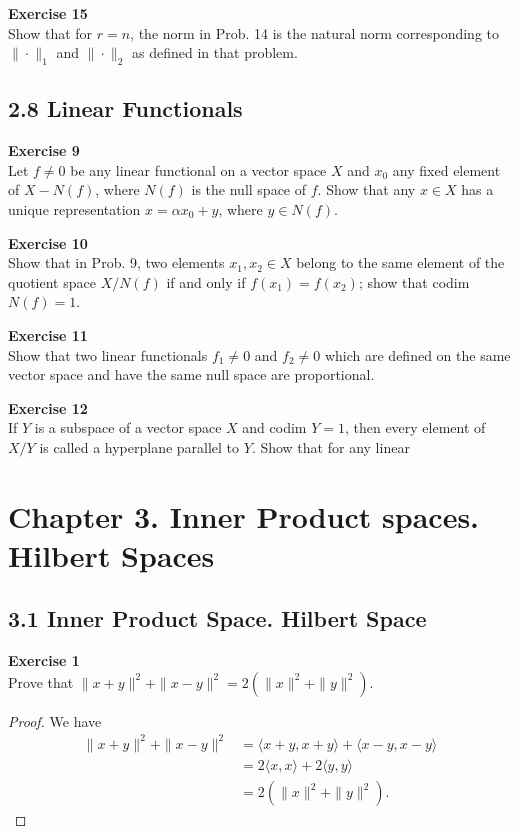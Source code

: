 \documentclass[12pt, a4paper]{article}
\theoremstyle{plain}
\newenvironment{exercise}[2][Exercise]
    { \begin{mdframed}[backgroundcolor=gray!20] \textbf{#1 #2} \\}
    {  \end{mdframed}}
\begin{document}
\begin{exercise}{15}
Show that for $r=n$, the norm in Prob. 14 is the natural norm corresponding to $\|\cdot\|_1$ and $\|\cdot\|_2$ as defined in that problem.
\end{exercise}

\subsection*{2.8 Linear Functionals}

\begin{exercise}{9}
Let $f\neq 0$ be any linear functional on a vector space $X$ and $x_0$ any fixed element of $X-N(f)$, where $N(f)$ is the null space of $f$. Show that any $x\in X$ has a unique representation $x=\alpha x_0+y$, where $y\in N(f)$.
\end{exercise}

\begin{exercise}{10}
Show that in Prob. 9, two elements $x_1,x_2\in X$ belong to the same element of the quotient space $X/N(f)$ if and only if $f(x_1)=f(x_2)$; show that codim $N(f)=1$.
\end{exercise}

\begin{exercise}{11}
Show that two linear functionals $f_1\neq 0$ and $f_2\neq 0$ which are defined on the same vector space and have the same null space are proportional.
\end{exercise}

\begin{exercise}{12}
If $Y$ is a subspace of a vector space $X$ and codim $Y=1$, then every element of $X/Y$ is called a hyperplane parallel to $Y$. Show that for any linear 
\end{exercise}

\pagebreak

\section*{Chapter 3. Inner Product spaces. Hilbert Spaces}

\subsection*{3.1 Inner Product Space. Hilbert Space}

\begin{exercise}{1}
Prove that $\|x+y\|^2 + \|x-y\|^2 = 2(\|x\|^2+\|y\|^2)$.
\end{exercise}
	\begin{proof}
	We have 
	\begin{align*}
	\|x+y\|^2+\|x-y\|^2 &= \langle{x+y,x+y}\rangle +\langle{x-y,x-y}\rangle\\
	&= 2\langle{x,x}\rangle + 2\langle{y,y}\rangle\\
	&= 2(\|x\|^2+\|y\|^2).
	\end{align*}
	\end{proof}
	
\end{document}
